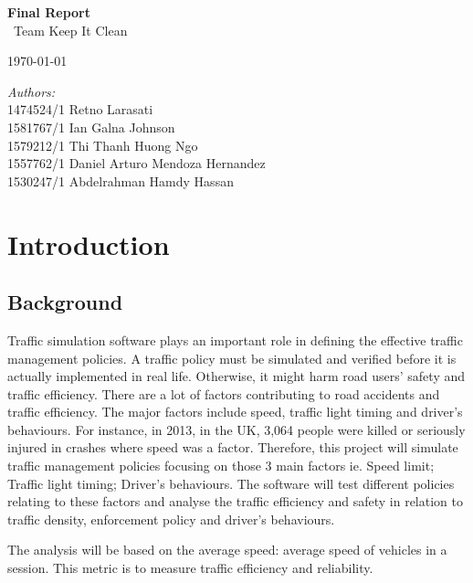 \documentclass[11pt]{article}
\begin{document}
	\begin{titlepage}
	\center
	\newcommand{\HRule}{\rule{\linewidth}{0.5mm}} 

        {\huge \bfseries Final Report}\\[0.4cm]
        	\ Team Keep It Clean
        
        {\large \today}\\[10cm] 
        
        \begin{minipage}{0.4\textwidth}
        		\emph{Authors:}\\
        			1474524/1	Retno Larasati\\
                    1581767/1	Ian Galna Johnson\\	
                    1579212/1	Thi Thanh Huong Ngo\\
                    1557762/1	Daniel Arturo Mendoza Hernandez\\
                    1530247/1	Abdelrahman Hamdy Hassan\\
        \end{minipage}

\end{titlepage}
\tableofcontents
\newpage
	
\section{Introduction}
\subsection{Background}
Traffic simulation software plays an important role in defining the effective traffic management policies. A traffic policy must be simulated and verified before it is actually implemented in real life. Otherwise, it might harm road users’ safety and traffic efficiency. There are a lot of factors contributing to road accidents and traffic efficiency. The major factors include speed, traffic light timing and driver’s behaviours. For instance, in 2013, in the UK, 3,064 people were killed or seriously injured in crashes where speed was a factor.
Therefore, this project will simulate traffic management policies focusing on those 3 main factors ie. Speed limit; Traffic light timing; Driver's behaviours. The software will test different policies relating to these factors and analyse the traffic efficiency and safety in relation to traffic density, enforcement policy and driver's behaviours.

The analysis will be based on the average speed: average speed of vehicles in a session. This metric is to measure traffic efficiency and reliability.
\end{document}
